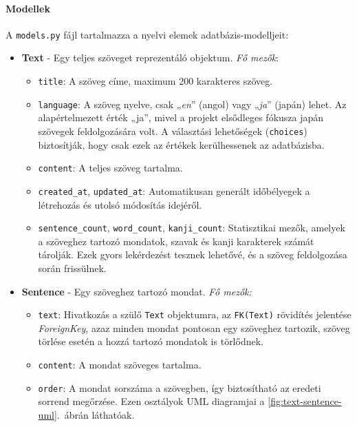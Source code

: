 \pagebreak

\paragraph{Modellek}

A \texttt{models.py} fájl tartalmazza a nyelvi elemek adatbázis-modelljeit:

\begin{itemize}
  \item \textbf{Text} - Egy teljes szöveget reprezentáló objektum.
  \textit{Fő mezők}:
  \begin{itemize}
    \item \texttt{title}: A szöveg címe, maximum 200 karakteres szöveg.
    \item \texttt{language}: A szöveg nyelve, csak „\textit{en}” (angol) vagy „\textit{ja}” (japán) lehet. Az alapértelmezett érték „ja”, mivel a projekt elsődleges fókusza japán szövegek feldolgozására volt. A választási lehetőségek (\texttt{choices}) biztosítják, hogy csak ezek az értékek kerülhessenek az adatbázisba.
    \item \texttt{content}: A teljes szöveg tartalma.
    \item \texttt{created\_at}, \texttt{updated\_at}: Automatikusan generált időbélyegek a létrehozás és utolsó módosítás idejéről.
    \item \texttt{sentence\_count}, \texttt{word\_count}, \texttt{kanji\_count}: Statisztikai mezők, amelyek a szöveghez tartozó mondatok, szavak és kanji karakterek számát tárolják. Ezek gyors lekérdezést tesznek lehetővé, és a szöveg feldolgozása során frissülnek.
  \end{itemize}
  
  \item \textbf{Sentence} - Egy szöveghez tartozó mondat.
  \textit{Fő mezők:}
  \begin{itemize}
    \item \texttt{text}: Hivatkozás a szülő \texttt{Text} objektumra, az \texttt{FK(Text)} rövidítés jelentése \textit{ForeignKey}, azaz minden mondat pontosan egy szöveghez tartozik, szöveg törlése esetén a hozzá tartozó mondatok is törlődnek. 
    \item \texttt{content}: A mondat szöveges tartalma.
    \item \texttt{order}: A mondat sorszáma a szövegben, így biztosítható az eredeti sorrend megőrzése. Ezen osztályok UML diagramjai a \ref{fig:text-sentence-uml}.~ábrán láthatóak.
  \end{itemize}


\end{itemize}
